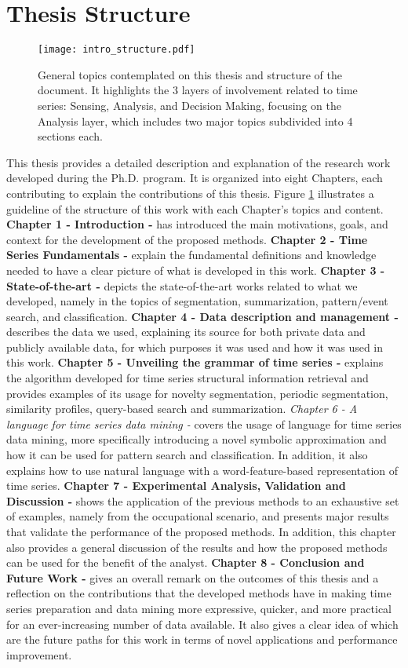 \section{Thesis Structure}
\label{sec:structure}

\begin{figure}
\centering
\texttt{[image: intro\_structure.pdf]}
\caption{General topics contemplated on this thesis and structure of the document. It highlights the 3 layers of involvement related to time series: Sensing, Analysis, and Decision Making, focusing on the Analysis layer, which includes two major topics subdivided into 4 sections each.}
\label{fig:intro}
\end{figure}

This thesis provides a detailed description and explanation of the research work developed during the Ph.D. program. It is organized into eight Chapters, each contributing to explain the contributions of this thesis. Figure \ref{fig:intro} illustrates a guideline of the structure of this work with each Chapter's topics and content. \textbf{Chapter 1 - Introduction -} has introduced the main motivations, goals, and context for the development of the proposed methods. \textbf{Chapter 2 - Time Series Fundamentals -} explain the fundamental definitions and knowledge needed to have a clear picture of what is developed in this work. \textbf{Chapter 3 - State-of-the-art -} depicts the state-of-the-art works related to what we developed, namely in the topics of segmentation, summarization, pattern/event search, and classification. \textbf{Chapter 4 - Data description and management -} describes the data we used, explaining its source for both private data and publicly available data, for which purposes it was used and how it was used in this work. \textbf{Chapter 5 - Unveiling the grammar of time series -} explains the algorithm developed for time series structural information retrieval and provides examples of its usage for novelty segmentation, periodic segmentation, similarity profiles, query-based search and summarization. \textit{Chapter 6 - A language for time series data mining -} covers the usage of language for time series data mining, more specifically introducing a novel symbolic approximation and how it can be used for pattern search and classification. In addition, it also explains how to use natural language with a word-feature-based representation of time series. \textbf{Chapter 7 - Experimental Analysis, Validation and Discussion -} shows the application of the previous methods to an exhaustive set of examples, namely from the occupational scenario, and presents major results that validate the performance of the proposed methods. In addition, this chapter also provides a general discussion of the results and how the proposed methods can be used for the benefit of the analyst. \textbf{Chapter 8 - Conclusion and Future Work -} gives an overall remark on the outcomes of this thesis and a reflection on the contributions that the developed methods have in making time series preparation and data mining more expressive, quicker, and more practical for an ever-increasing number of data available. It also gives a clear idea of which are the future paths for this work in terms of novel applications and performance improvement.

